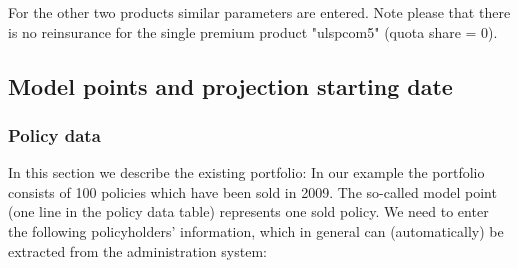For the other two products similar parameters are entered. Note please that there is no reinsurance for the single premium product "ulspcom5" (quota share = 0).

\subsection{Model points and projection starting date}
\subsubsection{Policy data}

In this section we describe the existing portfolio: In our example the portfolio consists of 100 policies which have been sold in 2009. The so-called model point (one line in the policy data table) represents one sold policy. We need to enter the following policyholders' information, which in general can (automatically) be extracted from the administration system:

